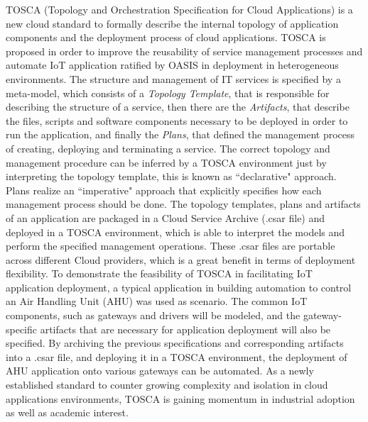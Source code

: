 TOSCA (Topology and Orchestration Specification for Cloud Applications) \cite{li2013towards} is a new
cloud standard to formally describe the internal topology of application components and the deployment
process of cloud applications. TOSCA is proposed in order to improve the reusability of service management
processes and automate IoT application ratified by OASIS in deployment in heterogeneous environments.
The structure and management of IT services is specified by a meta-model, which consists of
a \textit{Topology Template}, that is responsible for describing the structure of a service, then there
are the \textit{Artifacts}, that describe the files, scripts and software components necessary to be
deployed in order to run the application, and finally the \textit{Plans}, that defined the management process
of creating, deploying and terminating a service. The correct topology and management procedure can be inferred
by a TOSCA environment just by interpreting the topology template, this is known as ``declarative" approach.
Plans realize an ``imperative" approach that explicitly specifies how each management process should be done.
The topology templates, plans and artifacts of an application are packaged in a Cloud Service Archive (.csar file)
and deployed in a TOSCA environment, which is able to interpret the models and perform the specified management
operations. These .csar files are portable across different Cloud providers, which is a great benefit in terms
of deployment flexibility. To demonstrate the feasibility of TOSCA in facilitating IoT application deployment, a typical
application in building automation to control an Air Handling Unit (AHU) was used as scenario. The common IoT
components, such as gateways and drivers will be modeled, and the gateway-specific artifacts that are
necessary for application deployment will also be specified. By archiving the previous specifications
and corresponding artifacts into a .csar file, and deploying it in a TOSCA environment, the deployment
of AHU application onto various gateways can be automated. As a newly established standard to counter
growing complexity and isolation in cloud applications environments, TOSCA is gaining momentum in industrial
adoption as well as academic interest.
